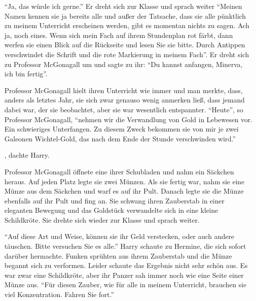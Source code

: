 \enquote{Ja, das würde ich gerne.} Er dreht sich zur Klasse und sprach weiter \enquote{Meinen Namen kennen sie ja bereits alle und außer der Tatsache, dass sie alle pünktlich zu meinem Unterricht erscheinen werden, gibt es momentan nichts zu sagen. \gst Ach ja, noch eines. Wenn sich mein Fach auf ihrem Stundenplan rot färbt, dann werfen sie einen Blick auf die Rückseite und lesen Sie sie bitte. Durch Antippen verschwindet die Schrift und die rote Markierung in meinem Fach}. Er dreht sich zu Professor McGonagall um und sagte zu ihr: \enquote{Du kannst anfangen, Minerva, ich bin fertig}.

Professor McGonagall hielt ihren Unterricht wie immer und man merkte, dass, anders als letztes Jahr, sie sich zwar genauso wenig anmerken ließ, dass jemand dabei war, der sie beobachtet, aber sie war wesentlich entspannter. \enquote{Heute}, so Professor McGonagall, \enquote{nehmen wir die Verwandlung von Gold in Lebewesen vor. Ein schwieriges Unterfangen. Zu diesem Zweck bekommen sie von mir je zwei Galeonen Wichtel-Gold, das nach dem Ende der Stunde verschwinden wird.}

, dachte Harry. 

Professor McGonagall öffnete eine ihrer Schubladen und nahm ein Säckchen heraus. Auf jeden Platz legte sie zwei Münzen. Als sie fertig war, nahm sie eine Münze aus dem Säckchen und warf es auf ihr Pult. Danach legte sie die Münze ebenfalls auf ihr Pult und fing an.  Sie schwang ihren Zauberstab in einer eleganten Bewegung und das Goldstück verwandelte sich in eine kleine Schildkröte. Sie drehte sich wieder zur Klasse und sprach weiter.

\enquote{Auf diese Art und Weise, können sie ihr Geld verstecken, oder auch andere täuschen. Bitte versuchen Sie es alle.} Harry schaute zu Hermine, die sich sofort darüber hermachte. Funken sprühten aus ihrem Zauberstab und die Münze begannt sich zu verformen. Leider schaute das Ergebnis nicht sehr schön aus. Es war zwar eine Schildkröte, aber ihr Panzer sah immer noch wie eine Seite einer Münze aus. \enquote{Für diesen Zauber, wie für alle in meinem Unterricht, brauchen sie viel Konzentration. Fahren Sie fort.}

